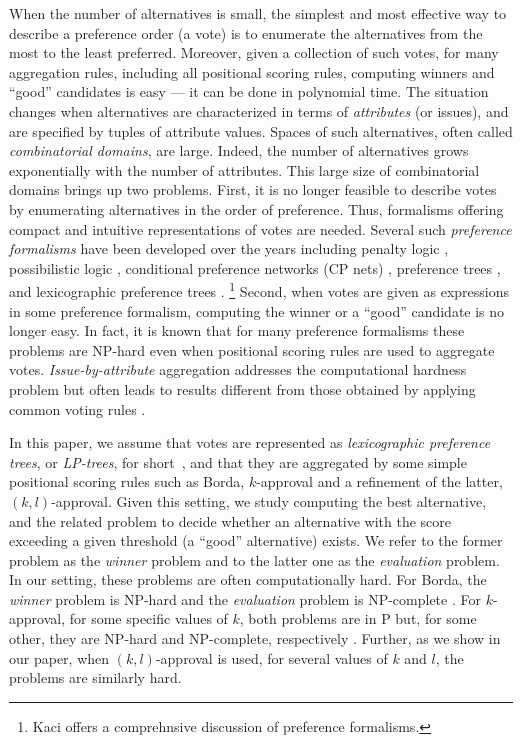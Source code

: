When the number of alternatives is small, the simplest and most effective 
way to describe a preference order (a vote) is to enumerate the
alternatives from the most to the least preferred. Moreover, given a 
collection of such votes, for many aggregation rules, including all 
positional scoring rules, computing winners and ``good'' candidates is 
easy --- it can be done in polynomial time. The situation changes when
alternatives are characterized in terms of \emph{attributes} (or issues),
and are specified by tuples of attribute values. Spaces of such alternatives,
often called \emph{combinatorial domains}, are large. Indeed, the number 
of alternatives grows exponentially with the number of attributes. This
large size of combinatorial domains brings up two problems. First, it is
no longer feasible to describe votes by enumerating alternatives in the
order of preference. Thus, formalisms offering compact and intuitive
representations of votes are needed. Several such \emph{preference
formalisms} have been developed over the years including penalty logic 
\cite{de1994penalty}, possibilistic logic \cite{DuboisLP91}, conditional
preference networks (CP nets) \cite{bbdh03}, preference
trees \cite{what}, and lexicographic preference trees \cite{what}.%
\footnote{Kaci \cite{Kaci:Pref} offers a comprehnsive discussion of 
preference formalisms.} Second, when votes are given as expressions in 
some preference formalism, computing the winner or a ``good'' candidate 
is no longer easy. In fact, it is known that for many preference formalisms 
these problems are NP-hard even when positional scoring rules are used 
to aggregate votes. \emph{Issue-by-attribute} aggregation addresses the
computational hardness problem but often leads to results different from 
those obtained by applying common voting rules \cite{fargier:ibi}.
  
In this paper, we assume that votes are represented as \emph{lexicographic
preference trees}, or \emph{LP-trees}, for short~\cite{booth:learningLP},
and that they are aggregated by some simple positional scoring rules such 
as Borda, $k$-approval and a refinement of the latter, $(k,l)$-approval.
Given this setting, we study computing the best alternative, and the related 
problem to decide whether an alternative with the score exceeding a given 
threshold (a ``good'' alternative) exists. We refer to the former problem 
as the \emph{winner} problem and to the latter one as 
the \emph{evaluation} problem. In our setting, these problems are often
computationally hard. For Borda, the \emph{winner} problem is NP-hard and 
the \emph{evaluation} problem is NP-complete \cite{lang:aggLP}. For $k$-approval, 
for some specific values of $k$, both problems are in P but, for some other, 
they are NP-hard and NP-complete, respectively \cite{lang:aggLP}. Further,
as we show in our paper, when $(k,l)$-approval is used, for several values 
of $k$ and $l$, the problems are similarly hard.

